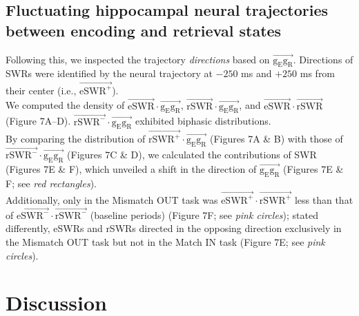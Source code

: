 \documentclass[final,3p,times,twocolumn]{elsarticle}
\begin{document}
\subsection{Fluctuating hippocampal neural trajectories between encoding and retrieval states}
Following this, we inspected the trajectory \textit{directions} based on $\overrightarrow{\mathrm{g_{E}g_{R}}}$. Directions of SWRs were identified by the neural trajectory at $-250$ ms and $+250$ ms from their center (i.e., $\overrightarrow{\mathrm{eSWR^+}}$).
\\
\indent
We computed the density of $\overrightarrow{\mathrm{eSWR}} \cdot \overrightarrow{\mathrm{g_{E}g_{R}}}$, $\overrightarrow{\mathrm{rSWR}} \cdot \overrightarrow{\mathrm{g_{E}g_{R}}}$, and $\overrightarrow{\mathrm{eSWR}} \cdot \overrightarrow{\mathrm{rSWR}}$ (Figure 7A--D). $\overrightarrow{\mathrm{rSWR^-}} \cdot \overrightarrow{\mathrm{g_{E}g_{R}}}$ exhibited biphasic distributions.
\\
\indent
By comparing the distribution of $\overrightarrow{\mathrm{rSWR^+}} \cdot \overrightarrow{\mathrm{g_{E}g_{R}}}$ (Figures 7A \& B) with those of $\overrightarrow{\mathrm{rSWR^-}} \cdot \overrightarrow{\mathrm{g_{E}g_{R}}}$ (Figures 7C \& D), we calculated the contributions of SWR (Figures 7E \& F), which unveiled a shift in the direction of $\overrightarrow{\mathrm{g_{E}g_{R}}}$ (Figures 7E \& F; see \textit{red rectangles}).
\\
\indent
Additionally, only in the Mismatch OUT task was $\overrightarrow{\mathrm{eSWR^+}} \cdot \overrightarrow{\mathrm{rSWR^+}}$ less than that of $\overrightarrow{\mathrm{eSWR^-}} \cdot \overrightarrow{\mathrm{rSWR^-}}$ (baseline periods) (Figure 7F; see \textit{pink circles}); stated differently, eSWRs and rSWRs directed in the opposing direction exclusively in the Mismatch OUT task but not in the Match IN task (Figure 7E; see \textit{pink circles}).
\label{sec:results}\section{Discussion}
\end{document}
